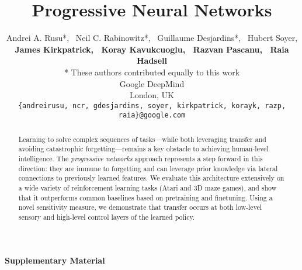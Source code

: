 \documentclass{article}
\title{Progressive Neural Networks}
\author{Andrei A. Rusu*, \ Neil C. Rabinowitz*, \ Guillaume Desjardins*, \ Hubert Soyer,\\
\textbf{James Kirkpatrick, \ Koray Kavukcuoglu, \ Razvan Pascanu, \ Raia Hadsell} \\
\small{* These authors contributed equally to this work}
\vspace{0.15 cm}
\\
Google DeepMind \\
London, UK
\vspace{0.15 cm}
\\
\small\texttt{\{andreirusu, ncr, gdesjardins, soyer, kirkpatrick, korayk, razp, raia\}@google.com} \\
}
\begin{document}

\maketitle

\begin{abstract}
Learning to solve complex sequences of tasks---while both leveraging transfer and
avoiding catastrophic forgetting---remains a key obstacle to achieving human-level
intelligence. The \emph{progressive networks} approach represents a step forward in this direction:
they are immune to forgetting and can leverage prior knowledge via lateral
connections to previously learned features. We evaluate this architecture
extensively on a wide variety of reinforcement learning tasks (Atari and 3D
maze games), and show that it outperforms common baselines based on pretraining
and finetuning. Using a novel sensitivity measure, we demonstrate
that transfer occurs at both low-level sensory and high-level control layers of the learned policy.
\end{abstract}












\newpage
\footnotesize
\setlength{\bibsep}{5pt}



\newpage

\appendix
{}

{\Large{\textbf{Supplementary Material}}}






\end{document}
